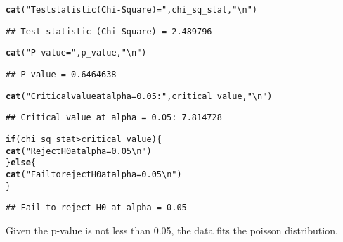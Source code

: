 \documentclass{article}\usepackage[]{graphicx}\usepackage[]{xcolor}
\makeatletter
\newcommand{\hlsng}[1]{\textcolor[rgb]{0.192,0.494,0.8}{#1}}%
\newcommand{\hlopt}[1]{\textcolor[rgb]{0,0,0}{#1}}%
\newcommand{\hldef}[1]{\textcolor[rgb]{0.345,0.345,0.345}{#1}}%
\newcommand{\hlkwa}[1]{\textcolor[rgb]{0.161,0.373,0.58}{\textbf{#1}}}%
\newcommand{\hlkwd}[1]{\textcolor[rgb]{0.737,0.353,0.396}{\textbf{#1}}}%
\newenvironment{kframe}{%
 \def\at@end@of@kframe{}%
 \ifinner\ifhmode%
  \def\at@end@of@kframe{\end{minipage}}%
  \begin{minipage}{\columnwidth}%
 \fi\fi%
 \def\FrameCommand##1{\hskip\@totalleftmargin \hskip-\fboxsep
 \colorbox{shadecolor}{##1}\hskip-\fboxsep
     \hskip-\linewidth \hskip-\@totalleftmargin \hskip\columnwidth}%
 \MakeFramed {\advance\hsize-\width
   \@totalleftmargin\z@ \linewidth\hsize
   \@setminipage}}%
 {\par\unskip\endMakeFramed%
 \at@end@of@kframe}
\newenvironment{knitrout}{}{} %
\makeatother
\begin{document}
\begin{knitrout}
\begin{kframe}
\begin{alltt}
\hlkwd{cat}\hldef{(}\hlsng{"Test statistic (Chi-Square) ="}\hldef{, chi_sq_stat,} \hlsng{"\textbackslash{}n"}\hldef{)}
\end{alltt}
\begin{verbatim}
## Test statistic (Chi-Square) = 2.489796
\end{verbatim}
\begin{alltt}
\hlkwd{cat}\hldef{(}\hlsng{"P-value ="}\hldef{, p_value,} \hlsng{"\textbackslash{}n"}\hldef{)}
\end{alltt}
\begin{verbatim}
## P-value = 0.6464638
\end{verbatim}
\begin{alltt}
\hlkwd{cat}\hldef{(}\hlsng{"Critical value at alpha = 0.05:"}\hldef{, critical_value,} \hlsng{"\textbackslash{}n"}\hldef{)}
\end{alltt}
\begin{verbatim}
## Critical value at alpha = 0.05: 7.814728
\end{verbatim}
\begin{alltt}
\hlkwa{if} \hldef{(chi_sq_stat} \hlopt{>} \hldef{critical_value) \{}
  \hlkwd{cat}\hldef{(}\hlsng{"Reject H0 at alpha = 0.05\textbackslash{}n"}\hldef{)}
\hldef{\}} \hlkwa{else} \hldef{\{}
  \hlkwd{cat}\hldef{(}\hlsng{"Fail to reject H0 at alpha = 0.05\textbackslash{}n"}\hldef{)}
\hldef{\}}
\end{alltt}
\begin{verbatim}
## Fail to reject H0 at alpha = 0.05
\end{verbatim}
\end{kframe}
\end{knitrout}

Given the p-value is not less than 0.05, the data fits the poisson distribution.
\end{document}
